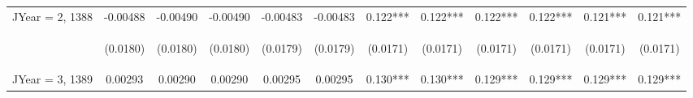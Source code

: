 \documentclass[]{article}
\begin{document}
\begin{center}
\begin{tabular}{lccccccccccc}
JYear = 2, 1388 & -0.00488 & -0.00490 & -0.00490 & -0.00483 & -0.00483 & 0.122*** & 0.122*** & 0.122*** & 0.122*** & 0.121*** & 0.121*** \\
\vspace{4pt} & \begin{footnotesize}(0.0180)\end{footnotesize} & \begin{footnotesize}(0.0180)\end{footnotesize} & \begin{footnotesize}(0.0180)\end{footnotesize} & \begin{footnotesize}(0.0179)\end{footnotesize} & \begin{footnotesize}(0.0179)\end{footnotesize} & \begin{footnotesize}(0.0171)\end{footnotesize} & \begin{footnotesize}(0.0171)\end{footnotesize} & \begin{footnotesize}(0.0171)\end{footnotesize} & \begin{footnotesize}(0.0171)\end{footnotesize} & \begin{footnotesize}(0.0171)\end{footnotesize} & \begin{footnotesize}(0.0171)\end{footnotesize} \\
JYear = 3, 1389 & 0.00293 & 0.00290 & 0.00290 & 0.00295 & 0.00295 & 0.130*** & 0.130*** & 0.129*** & 0.129*** & 0.129*** & 0.129*** \\

\end{tabular}
\end{center}
\end{document}
